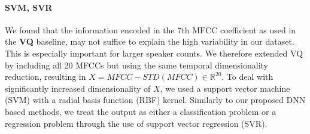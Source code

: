 \paragraph*{\textbf{SVM, SVR}}
We found that the information encoded in the 7th \(\mbox{MFCC}\) coefficient as used in the \textbf{VQ} baseline, may not suffice to  explain the high variability in our dataset.
This is especially important for larger speaker counts.
We therefore extended \textsc{VQ} by including all 20 MFCCs but using the same temporal dimensionality reduction, resulting in \(X = \overline{MFCC} - STD(MFCC) \in \mathbb{R}^{20}\).
To deal with significantly increased dimensionality of \(X\), we used a support vector machine (SVM) with a radial basis function (RBF) kernel.
Similarly to our proposed DNN based methods, we treat the output as either a classification problem or a regression problem through the use of support vector regression (SVR).

